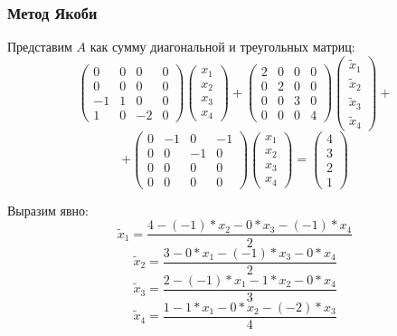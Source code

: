 \documentclass[10pt]{beamer}
\begin{document}
\begin{frame}[fragile]
\frametitle{Метод Якоби}
Представим $A$ как сумму диагональной и треугольных матриц:
$$
\begin{pmatrix}
0 & 0 & 0 & 0 \\
0 & 0 & 0 & 0 \\
-1 & 1 & 0 & 0 \\
1 & 0 & -2 & 0 
\end{pmatrix}
\begin{pmatrix}
x_1 \\
x_2 \\
x_3 \\
x_4
\end{pmatrix}
+
\begin{pmatrix}
2 & 0 & 0 & 0 \\
0 & 2 & 0 & 0 \\
0 & 0 & 3 & 0 \\
0 & 0 & 0 & 4 
\end{pmatrix}
\begin{pmatrix}
\tilde{x}_1 \\
\tilde{x}_2 \\
\tilde{x}_3 \\
\tilde{x}_4
\end{pmatrix}
+
$$
$$
+
\begin{pmatrix}
0 & -1 & 0 & -1 \\
0 & 0 & -1 & 0 \\
0 & 0 & 0 & 0 \\
0 & 0 & 0 & 0 
\end{pmatrix}
\begin{pmatrix}
x_1 \\
x_2 \\
x_3 \\
x_4
\end{pmatrix}
=
\begin{pmatrix}
4 \\
3 \\
2 \\
1
\end{pmatrix}
$$

Выразим явно:
$$\tilde{x}_1 = \frac{ 4 - (-1) * x_2 - 0 * x_3 - (-1) * x_4 }{2} $$
$$\tilde{x}_2 = \frac{ 3 - 0 * x_1 - (-1) * x_3 - 0 * x_4 }{2} $$
$$\tilde{x}_3 = \frac{ 2 - (-1) * x_1 - 1 * x_2 - 0 * x_4 }{3} $$
$$\tilde{x}_4 = \frac{ 1 - 1 * x_1 - 0 * x_2 - (-2) * x_3 }{4} $$
\end{frame}
\end{document}
